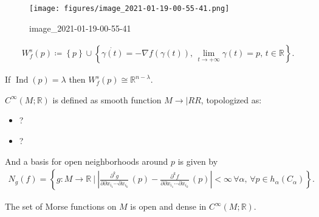 \begin{example}[?]

\begin{figure}
\centering
\texttt{[image: figures/image\_2021-01-19-00-55-41.png]}
\caption{image\_2021-01-19-00-55-41}
\end{figure}

\end{example}

\begin{definition}

\begin{align*}
W_f^s(p) \coloneqq\left\{{p}\right\} \cup\left\{{
\dot{\gamma(t)} = -\nabla f(\gamma(t)),\, \lim_{t\to +\infty} \gamma(t) = p,\, t\in {\mathbb{R}}
}\right\}
.\end{align*}

\end{definition}

\begin{lemma}[?]

If \(\mathop{\mathrm{Ind}}(p) = \lambda\) then
\(W_f^s(p) \cong {\mathbb{R}}^{n- \lambda}\).

\end{lemma}

\begin{definition}[$C^\infty$ ]

\(C^ \infty (M; {\mathbb{R}})\) is defined as smooth function
\(M\to |RR\), topologized as:

\begin{itemize}
\tightlist
\item
  ?
\item
  ?
\end{itemize}

And a basis for open neighborhoods around \(p\) is given by
\begin{align*}
N_g(f) = \left\{{
g:M\to {\mathbb{R}}{~\mathrel{\Big|}~}
{\left\lvert {
{\frac{\partial ^k g}{\partial {\partial}x _{i_1} \cdots {\partial}x _{i_k} }\,}(p)
- 
{\frac{\partial ^k f}{\partial {\partial}x _{i_1} \cdots {\partial}x _{i_k} }\,}(p)
} \right\rvert} < \infty\, \forall \alpha,\, \forall p\in h_ \alpha(C_ \alpha)
}\right\}
.\end{align*}

\end{definition}

\begin{theorem}[?]

The set of Morse functions on \(M\) is open and dense in
\(C^ \infty (M; {\mathbb{R}})\).

\end{theorem}

